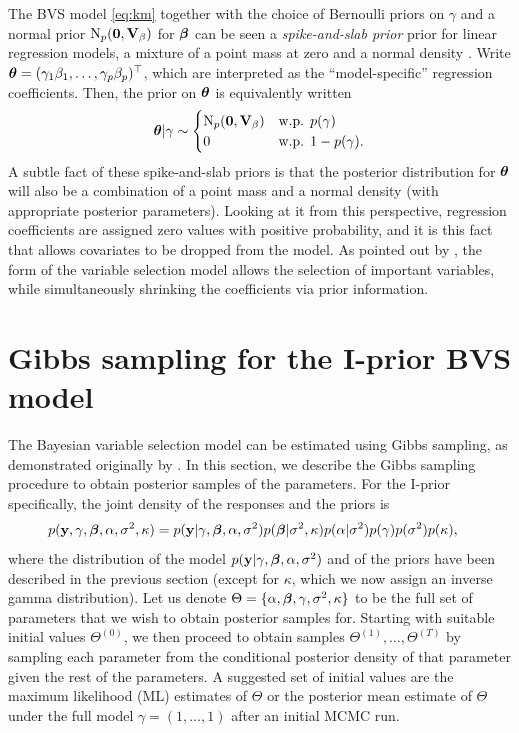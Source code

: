 \documentclass[11pt,twoside,openright]{report}
\begin{document}
\begin{remark}
  The BVS model \cref{eq:km} together with the choice of Bernoulli priors on $\gamma$ and a normal prior $\operatorname{N}_p({\mathbf 0},{\mathbf V}_\beta)$ for ${\bm\beta}$ can be seen a \emph{spike-and-slab prior} prior for linear regression models, a mixture of a point mass at zero and a normal density \citep{mitchell1988bayesian,geweke1996variable}.
  Write ${\bm\theta} = (\gamma_1\beta_1,\dots,\gamma_p\beta_p)^\top$, which are interpreted as the ``model-specific'' regression coefficients.
  Then, the prior on ${\bm\theta}$ is equivalently written
  \[
    {\bm\theta}|\gamma \sim
    \begin{cases}
      \operatorname{N}_p({\mathbf 0},{\mathbf V}_\beta) & \text{w.p. } p(\gamma) \\
      0 & \text{w.p. } 1 - p(\gamma).
    \end{cases}
  \]
  A subtle fact of these spike-and-slab priors is that the posterior distribution for ${\bm\theta}$ will also be a combination of a point mass and a normal density (with appropriate posterior parameters).
  Looking at it from this perspective, regression coefficients are assigned zero values with positive probability, and it is this fact that allows covariates to be dropped from the model.
  As pointed out by \citet{Kuo1998}, the form of the variable selection model allows the selection of important variables, while simultaneously shrinking the coefficients via prior information.
\end{remark}

\section{Gibbs sampling for the I-prior BVS model}

The Bayesian variable selection model can be estimated using Gibbs sampling, as demonstrated originally by \citet{Kuo1998}.
In this section, we describe the Gibbs sampling procedure to obtain posterior samples of the parameters.
For the I-prior specifically, the joint density of the responses and the priors is 
\begin{align*}
  p({\mathbf y},\gamma,{\bm\beta},\alpha,\sigma^2,\kappa)
  &= p({\mathbf y}|\gamma,{\bm\beta},\alpha,\sigma^2)p({\bm\beta}|\sigma^2,\kappa)p(\alpha|\sigma^2)p(\gamma)p(\sigma^2)p(\kappa),
\end{align*}
where the distribution of the model $p({\mathbf y}|\gamma,{\bm\beta},\alpha,\sigma^2)$ and of the priors have been described in the previous section (except for $\kappa$, which we now assign an inverse gamma distribution).
Let us denote $\Theta=\{\alpha,{\bm\beta},\gamma,\sigma^2,\kappa\}$ to be the full set of parameters that we wish to obtain posterior samples for.
Starting with suitable initial values $\Theta^{(0)}$, we then proceed to obtain samples $\Theta^{(1)}, \dots, \Theta^{(T)}$ by sampling each parameter from the conditional posterior density of that parameter given the rest of the parameters.
A suggested set of initial values are the maximum likelihood (ML) estimates of $\Theta$ or the posterior mean estimate of $\Theta$ under the full model $\gamma=(1,\dots,1)$ after an initial MCMC run.
\end{document}
